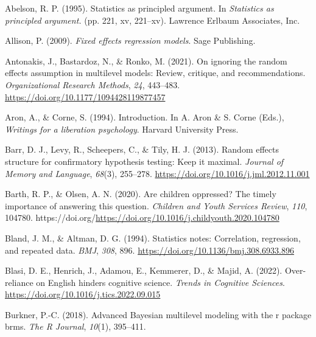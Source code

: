 \documentclass[
  letterpaper,
  DIV=11,
  numbers=noendperiod]{scrreprt}
\newlength{\cslhangindent}
\newlength{\cslentryspacingunit} %
\newenvironment{CSLReferences}[2] %
 {%
  \setlength{\parindent}{0pt}
  \ifodd #1
  \let\oldpar\par
  \def\par{\hangindent=\cslhangindent\oldpar}
  \fi
  \setlength{\parskip}{#2\cslentryspacingunit}
 }%
 {}
\begin{document}

\hypertarget{refs}{}
\begin{CSLReferences}{1}{0}
\leavevmode{}%
Abelson, R. P. (1995). Statistics as principled argument. In
\emph{Statistics as principled argument.} (pp. 221, xv, 221--xv).
Lawrence Erlbaum Associates, Inc.

\leavevmode{}%
Allison, P. (2009). \emph{Fixed effects regression models}. Sage
Publishing.

\leavevmode{}%
Antonakis, J., Bastardoz, N., \& Ronko, M. (2021). On ignoring the
random effects assumption in multilevel models: Review, critique, and
recommendations. \emph{Organizational Research Methods}, \emph{24},
443--483. \url{https://doi.org/10.1177/1094428119877457}

\leavevmode{}%
Aron, A., \& Corne, S. (1994). Introduction. In A. Aron \& S. Corne
(Eds.), \emph{Writings for a liberation psychology}. Harvard University
Press.

\leavevmode{}%
Barr, D. J., Levy, R., Scheepers, C., \& Tily, H. J. (2013). Random
effects structure for confirmatory hypothesis testing: Keep it maximal.
\emph{Journal of Memory and Language}, \emph{68}(3), 255--278.
\url{https://doi.org/10.1016/j.jml.2012.11.001}

\leavevmode{}%
Barth, R. P., \& Olsen, A. N. (2020). Are children oppressed? The timely
importance of answering this question. \emph{Children and Youth Services
Review}, \emph{110}, 104780.
https://doi.org/\url{https://doi.org/10.1016/j.childyouth.2020.104780}

\leavevmode{}%
Bland, J. M., \& Altman, D. G. (1994). Statistics notes: Correlation,
regression, and repeated data. \emph{BMJ}, \emph{308}, 896.
\url{https://doi.org/10.1136/bmj.308.6933.896}

\leavevmode{}%
Blasi, D. E., Henrich, J., Adamou, E., Kemmerer, D., \& Majid, A.
(2022). Over-reliance on {E}nglish hinders cognitive science.
\emph{Trends in Cognitive Sciences}.
\url{https://doi.org/10.1016/j.tics.2022.09.015}

\leavevmode{}%
Burkner, P.-C. (2018). Advanced {B}ayesian multilevel modeling with the
r package brms. \emph{The R Journal}, \emph{10}(1), 395--411.


\end{CSLReferences}
\end{document}
